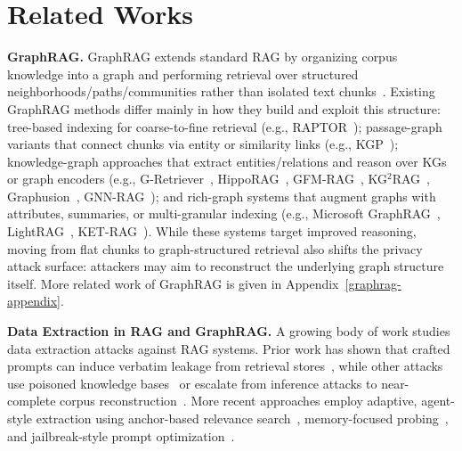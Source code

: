 \section{Related Works}

\noindent\textbf{GraphRAG.} GraphRAG extends standard RAG by organizing corpus knowledge into a graph and performing retrieval over structured neighborhoods/paths/communities rather than isolated text chunks~\cite{zhang2025survey,nguyen2026urag}. Existing GraphRAG methods differ mainly in how they build and exploit this structure: tree-based indexing for coarse-to-fine retrieval (e.g., RAPTOR~\cite{sarthi2024raptor}); passage-graph variants that connect chunks via entity or similarity links (e.g., KGP~\cite{wang2024knowledge}); knowledge-graph approaches that extract entities/relations and reason over KGs or graph encoders (e.g., G-Retriever~\cite{he2024g}, HippoRAG~\cite{jimenez2024hipporag}, GFM-RAG~\cite{luo2025gfm}, KG$^2$RAG~\cite{zhu2025knowledge}, Graphusion~\cite{yang2025graphusion}, GNN-RAG~\cite{mavromatis2025gnn}); and rich-graph systems that augment graphs with attributes, summaries, or multi-granular indexing (e.g., Microsoft GraphRAG~\cite{edge2024local}, LightRAG~\cite{guo2024lightrag}, KET-RAG~\cite{huang2025ket}). 
While these systems target improved reasoning, moving from flat chunks to graph-structured retrieval also shifts the privacy attack surface: attackers may aim to reconstruct the underlying graph structure itself. 
More related work of GraphRAG is given in Appendix~\ref{graphrag-appendix}.

\noindent\textbf{Data Extraction in RAG and GraphRAG.} A growing body of work studies data extraction attacks against RAG systems. Prior work has shown that crafted prompts can induce verbatim leakage from retrieval stores~\cite{zeng2024good,qifollow,qi2026benchmarking}, while other attacks use poisoned knowledge bases~\cite{chaudhari2024phantom} or escalate from inference attacks to near-complete corpus reconstruction~\cite{cohen2024unleashing}. More recent approaches employ adaptive, agent-style extraction using anchor-based relevance search~\citealp{di2024pirates}, memory-focused probing~\citealp{wang2025unveiling,jiang2025feedback,wang2025silent}, and jailbreak-style prompt optimization~\cite{he2025external}.


